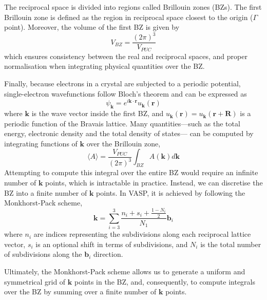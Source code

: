 \begin{itemize}
The reciprocal space is divided into regions called Brillouin zones (BZs). 
The first Brillouin zone is defined as the region in reciprocal space closest
to the origin ($\Gamma$ point). Moreover, the volume of the first BZ is given by
\begin{equation}
    \label{eq87}
    V_{BZ} = \frac{(2\pi)^3}{V_{PUC}}
\end{equation}
which ensures consistency between the real and reciprocal spaces, and 
proper normalisation when integrating physical quantities over the 
BZ.

Finally, because electrons in a crystal are subjected to a periodic potential, single-electron wavefunctions follow Bloch's theorem and can be expressed as 
\begin{equation}
    \label{eq88}
    \psi_{\mathbf{k}} = e^{i\mathbf{k} \cdot \mathbf{r}} u_{\mathbf{k}}(\mathbf{r})
\end{equation}
where $\mathbf{k}$ is the wave vector inside the first BZ, and 
$u_{\mathbf{k}}(\mathbf{r}) = u_{\mathbf{k}}(\mathbf{r}+\mathbf{R})$ is a periodic function of the Bravais lattice.
Many quantities---such as the total energy, electronic density and the total density of states---
can be computed by integrating functions of $\mathbf{k}$ over the 
Brillouin zone, 
\begin{equation}
    \label{eq89}
    \langle A \rangle = \frac{V_{PUC}}{(2\pi)^3} \int_{BZ} A(\mathbf{k}) d\mathbf{k}
\end{equation}
Attempting to compute this integral over the entire BZ would require 
an infinite number of $\mathbf{k}$ points, which is intractable in practice. Instead, 
we can discretise the BZ into a finite number of $\mathbf{k}$ points. 
In VASP, it is achieved by following the Monkhorst-Pack\supercite{Monkhorst1976} scheme, 
\begin{equation}
    \label{eq90}
    \mathbf{k} = \sum_{i=3}^{3} \frac{n_i + s_i + \frac{1 - N_i}{2}}{N_1} \mathbf{b}_i 
\end{equation}
where $n_i$ are indices representing the subdivisions along each reciprocal lattice vector, 
$s_i$ is an optional shift in terms of subdivisions, and $N_i$ is the total 
number of subdivisions along the $\mathbf{b}_i$ direction. 
 
Ultimately, the Monkhorst-Pack scheme allows us to generate a uniform and 
symmetrical grid of $\mathbf{k}$ points in the BZ, and, consequently, to 
compute integrals over the BZ by summing over a finite number of $\mathbf{k}$ points. 


\end{itemize}
